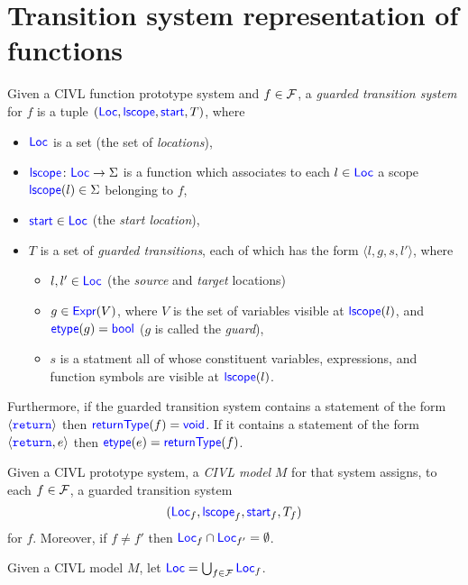 \documentclass[11pt, oneside, letterpaper]{book}
\begin{document}
\section{Transition system representation of functions}
\label{sec:gts}

\begin{definition}
  Given a CIVL function prototype system and $f\in\Func$,
  a \emph{guarded transition system} for $f$ 
  is a tuple $(\Loc,\lscope,\start, T)$, where
  \begin{itemize}
  \item $\Loc$ is a set (the set of \emph{locations}),
  \item $\lscope\colon\Loc\ra\Sigma$ is a function which associates
    to each $l\in\Loc$ a scope $\lscope(l)\in\Sigma$ belonging to $f$,
  \item $\start\in\Loc$ (the \emph{start location}),
  \item $T$ is a set of \emph{guarded transitions}, each of which has
    the form $\langle l,g,s,l'\rangle$, where
    \begin{itemize}
    \item $l,l'\in\Loc$ (the \emph{source} and \emph{target}
      locations)
    \item $g\in\Expr(V)$, where $V$ is the set of variables visible at
      $\lscope(l)$, and $\etype(g)=\bool$ ($g$ is called the
      \emph{guard}),
    \item $s$ is a statment all of whose constituent variables,
      expressions, and function symbols are visible at $\lscope(l)$.
    \end{itemize}
  \end{itemize}
  Furthermore, if the guarded transition system contains a statement
  of the form $\langle\code{return}\rangle$ then
  $\returntype(f)=\void$.  If it contains a statement of the form
  $\langle\code{return},e\rangle$ then $\etype(e)=\returntype(f)$.
\end{definition}

\begin{definition}
  Given a CIVL prototype system, a \emph{CIVL model} $M$ for that
  system assigns, to each $f\in\Func$, a guarded transition system
  \[(\Loc_f,\lscope_f, \start_f,T_f)\] for $f$.  Moreover, if $f\neq f'$
  then
  $\Loc_f\cap\Loc_{f'}=\emptyset$.
\end{definition}

\begin{definition}
  Given a CIVL model $M$, let $\Loc=\bigcup_{f\in\Func}\Loc_f$.
\end{definition}
\end{document}
